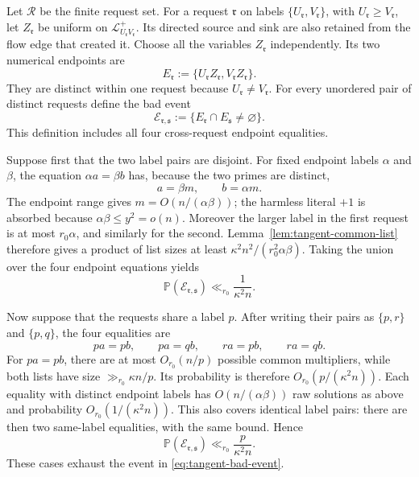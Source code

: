 \documentclass[11pt]{article}
\numberwithin{equation}{section}
\theoremstyle{definition}
\theoremstyle{remark}
\newcommand{\1}{\mathbf 1}
\begin{document}
Let \(\mathscr R\) be the finite request set.  For a request
\(\mathfrak r\) on labels
\(\{U_{\mathfrak r},V_{\mathfrak r}\}\), with
\(U_{\mathfrak r}\geq V_{\mathfrak r}\), let \(Z_{\mathfrak r}\) be
uniform on \(\mathcal L^+_{U_{\mathfrak r}V_{\mathfrak r}}\).  Its
directed source and sink are also retained from the flow edge that
created it.  Choose all
the variables \(Z_{\mathfrak r}\) independently.  Its two numerical
endpoints are
\[
 E_{\mathfrak r}:=
 \{U_{\mathfrak r}Z_{\mathfrak r},
   V_{\mathfrak r}Z_{\mathfrak r}\}.
\]
They are distinct within one request because
\(U_{\mathfrak r}\ne V_{\mathfrak r}\).
For every unordered pair of distinct requests define the bad event
\begin{equation}
 \mathscr E_{\mathfrak r,\mathfrak s}
 :=\{E_{\mathfrak r}\cap E_{\mathfrak s}\ne\varnothing\}.
\label{eq:tangent-bad-event}
\end{equation}
This definition includes all four cross-request endpoint equalities.

Suppose first that the two label pairs are disjoint.  For fixed endpoint
labels \(\alpha\) and \(\beta\), the equation
\(\alpha a=\beta b\) has, because the two primes are distinct,
\[
                         a=\beta m,\qquad b=\alpha m.
\]
The endpoint range gives \(m=O(n/(\alpha\beta))\); the harmless literal
\(+1\) is absorbed because \(\alpha\beta\leq y^2=o(n)\).  Moreover the
larger label in the first request is at most \(r_0\alpha\), and similarly
for the second.  Lemma~\ref{lem:tangent-common-list} therefore gives a
product of list sizes at least
\(\kappa^2n^2/(r_0^2\alpha\beta)\).  Taking the union over the four
endpoint equations yields
\begin{equation}
 \mathbb P(\mathscr E_{\mathfrak r,\mathfrak s})
       \ll_{r_0}\frac1{\kappa^2n}.
\label{eq:tangent-collision-disjoint-labels}
\end{equation}

Now suppose that the requests share a label \(p\).  After writing their
pairs as \(\{p,r\}\) and \(\{p,q\}\), the four equalities are
\[
 pa=pb,\qquad pa=qb,\qquad ra=pb,\qquad ra=qb.
\]
For \(pa=pb\), there are at most \(O_{r_0}(n/p)\) possible common
multipliers, while both lists have size
\(\gg_{r_0}\kappa n/p\).  Its probability is therefore
\(O_{r_0}(p/(\kappa^2n))\).  Each equality with distinct endpoint labels
has \(O(n/(\alpha\beta))\) raw solutions as above and probability
\(O_{r_0}(1/(\kappa^2n))\).  This also covers identical label pairs:
there are then two same-label equalities, with the same bound.  Hence
\begin{equation}
 \mathbb P(\mathscr E_{\mathfrak r,\mathfrak s})
       \ll_{r_0}\frac{p}{\kappa^2n}.
\label{eq:tangent-collision-shared-label}
\end{equation}
These cases exhaust the event in \eqref{eq:tangent-bad-event}.
\end{document}
